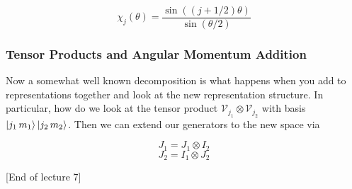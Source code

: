 \documentclass{article}
\theoremstyle{definition}
\begin{document}
$$ \chi_j(\theta) = \frac{\sin((j + 1/2) \theta)}{\sin(\theta / 2)} $$

\subsubsection{Tensor Products and Angular Momentum Addition}

Now a somewhat well known decomposition is what happens when you add to
representations together and look at the new representation structure. In
particular, how do we look at the tensor product $\mathcal{V}_{j_1} \otimes
\mathcal{V}_{j_2}$ with basis $\ket{j_1 \, m_1} \ket{j_2 \, m_2}$. Then we can
extend our generators to the new space via 

$$ J_1 = J_1 \otimes I_2 $$
$$ J_2 = I_1 \otimes J_2 $$

[End of lecture 7]
\end{document}
